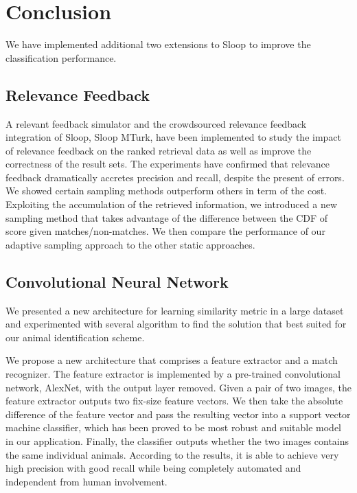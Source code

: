 \chapter{Conclusion}

We have implemented additional two extensions to Sloop to improve the
classification performance.

\section{Relevance Feedback} A relevant feedback simulator and the crowdsourced
relevance feedback integration of Sloop, Sloop MTurk, have been implemented to
study the impact of relevance feedback on the ranked retrieval data as well as
improve the correctness of the result sets. The experiments have confirmed that
relevance feedback dramatically accretes precision and recall, despite the
present of errors. We showed certain sampling methods outperform others in term
of the cost. Exploiting the accumulation of the retrieved information, we
introduced a new sampling method that takes advantage of the difference between
the CDF of score given matches/non-matches. We then compare the performance of
our adaptive sampling approach to the other static  approaches.

\section{Convolutional Neural Network}

We presented a new architecture for learning similarity metric in a large
dataset and experimented with several algorithm to find the solution that best
suited for our animal identification scheme. 

We propose a new architecture that comprises a feature extractor and a match
recognizer. The feature extractor is implemented by a pre-trained convolutional
network, AlexNet, with the output layer removed. Given a pair of two images,
the feature extractor outputs two fix-size feature vectors. We then take the
absolute difference of the feature vector and pass the resulting vector into a
support vector machine classifier, which has been proved to be most robust and
suitable model in our application. Finally, the classifier outputs whether the
two images contains the same individual animals. According to the results, it
is able to achieve very high precision with good recall while being completely
automated and independent from human involvement. 


